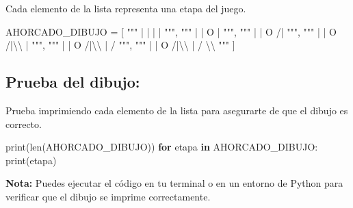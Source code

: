 \documentclass[
  a4paper,
  DIV=11,
  numbers=noendperiod,
  onepage,
  openany]{scrreprt}
\newenvironment{Shaded}{\begin{snugshade}}{\end{snugshade}}
\newcommand{\BuiltInTok}[1]{\textcolor[rgb]{0.00,0.23,0.31}{#1}}
\newcommand{\CharTok}[1]{\textcolor[rgb]{0.13,0.47,0.30}{#1}}
\newcommand{\ControlFlowTok}[1]{\textcolor[rgb]{0.00,0.23,0.31}{\textbf{#1}}}
\newcommand{\KeywordTok}[1]{\textcolor[rgb]{0.00,0.23,0.31}{\textbf{#1}}}
\newcommand{\NormalTok}[1]{\textcolor[rgb]{0.00,0.23,0.31}{#1}}
\newcommand{\OperatorTok}[1]{\textcolor[rgb]{0.37,0.37,0.37}{#1}}
\newcommand{\StringTok}[1]{\textcolor[rgb]{0.13,0.47,0.30}{#1}}
\begin{document}
Cada elemento de la lista representa una etapa del juego.

\begin{Shaded}
\begin{Highlighting}[]
\NormalTok{AHORCADO\_DIBUJO }\OperatorTok{=}\NormalTok{ [}
    \StringTok{"""}
\StringTok{       |}
\StringTok{       |}
\StringTok{       |}
\StringTok{       |}
\StringTok{    """}\NormalTok{,}
    \StringTok{"""}
\StringTok{       |}
\StringTok{       |}
\StringTok{       O}
\StringTok{       |}
\StringTok{    """}\NormalTok{,}
    \StringTok{"""}
\StringTok{       |}
\StringTok{       |}
\StringTok{       O}
\StringTok{      /|}
\StringTok{    """}\NormalTok{,}
    \StringTok{"""}
\StringTok{       |}
\StringTok{       |}
\StringTok{       O}
\StringTok{      /|}\CharTok{\textbackslash{}\textbackslash{}}
\StringTok{       |}
\StringTok{    """}\NormalTok{,}
    \StringTok{"""}
\StringTok{       |}
\StringTok{       |}
\StringTok{       O}
\StringTok{      /|}\CharTok{\textbackslash{}\textbackslash{}}
\StringTok{       |}
\StringTok{      /}
\StringTok{    """}\NormalTok{,}
    \StringTok{"""}
\StringTok{       |}
\StringTok{       |}
\StringTok{       O}
\StringTok{      /|}\CharTok{\textbackslash{}\textbackslash{}}
\StringTok{       |}
\StringTok{      / }\CharTok{\textbackslash{}\textbackslash{}}
\StringTok{    """}
\NormalTok{]}
\end{Highlighting}
\end{Shaded}

\subsection{Prueba del dibujo:}\label{prueba-del-dibujo}

Prueba imprimiendo cada elemento de la lista para asegurarte de que el
dibujo es correcto.

\begin{Shaded}
\begin{Highlighting}[]
\BuiltInTok{print}\NormalTok{(}\BuiltInTok{len}\NormalTok{(AHORCADO\_DIBUJO))}
\ControlFlowTok{for}\NormalTok{ etapa }\KeywordTok{in}\NormalTok{ AHORCADO\_DIBUJO:}
    \BuiltInTok{print}\NormalTok{(etapa)}
\end{Highlighting}
\end{Shaded}

\begin{tcolorbox}[enhanced jigsaw, toptitle=1mm, titlerule=0mm, left=2mm, opacityback=0, coltitle=black, leftrule=.75mm, title=\textcolor{quarto-callout-tip-color}{\faLightbulb}\hspace{0.5em}{Tip}, bottomrule=.15mm, arc=.35mm, opacitybacktitle=0.6, bottomtitle=1mm, toprule=.15mm, colbacktitle=quarto-callout-tip-color!10!white, rightrule=.15mm, breakable, colframe=quarto-callout-tip-color-frame, colback=white]

\textbf{Nota:} Puedes ejecutar el código en tu terminal o en un entorno
de Python para verificar que el dibujo se imprime correctamente.

\end{tcolorbox}
\end{document}
